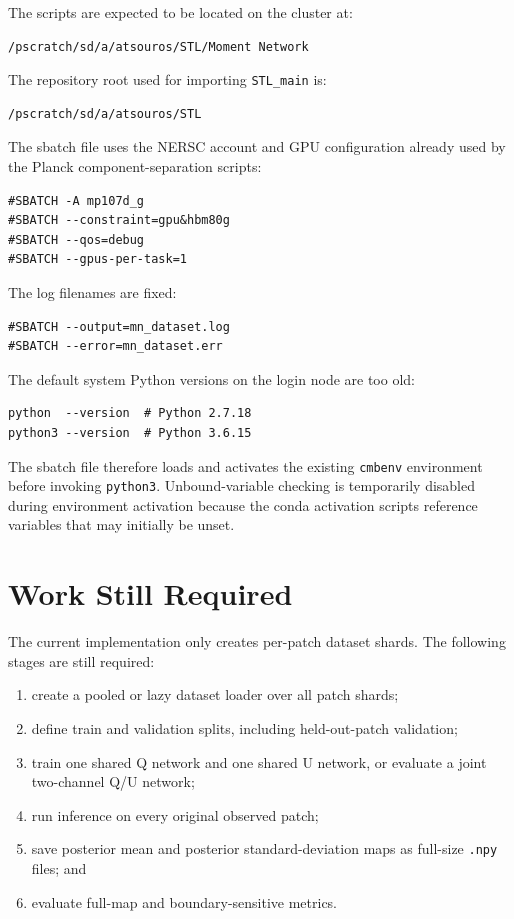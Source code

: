 \documentclass[11pt]{article}
\begin{document}
The scripts are expected to be located on the cluster at:

\begin{lstlisting}
/pscratch/sd/a/atsouros/STL/Moment Network
\end{lstlisting}

The repository root used for importing \texttt{STL\_main} is:

\begin{lstlisting}
/pscratch/sd/a/atsouros/STL
\end{lstlisting}

The sbatch file uses the NERSC account and GPU configuration already used by
the Planck component-separation scripts:

\begin{lstlisting}
#SBATCH -A mp107d_g
#SBATCH --constraint=gpu&hbm80g
#SBATCH --qos=debug
#SBATCH --gpus-per-task=1
\end{lstlisting}

The log filenames are fixed:

\begin{lstlisting}
#SBATCH --output=mn_dataset.log
#SBATCH --error=mn_dataset.err
\end{lstlisting}

The default system Python versions on the login node are too old:

\begin{lstlisting}
python  --version  # Python 2.7.18
python3 --version  # Python 3.6.15
\end{lstlisting}

The sbatch file therefore loads and activates the existing \texttt{cmbenv}
environment before invoking \texttt{python3}.  Unbound-variable checking is
temporarily disabled during environment activation because the conda activation
scripts reference variables that may initially be unset.

\section{Work Still Required}

The current implementation only creates per-patch dataset shards.  The
following stages are still required:

\begin{enumerate}
  \item create a pooled or lazy dataset loader over all patch shards;
  \item define train and validation splits, including held-out-patch
        validation;
  \item train one shared Q network and one shared U network, or evaluate a
        joint two-channel Q/U network;
  \item run inference on every original observed patch;
  \item save posterior mean and posterior standard-deviation maps as
        full-size \texttt{.npy} files; and
  \item evaluate full-map and boundary-sensitive metrics.
\end{enumerate}
\end{document}
